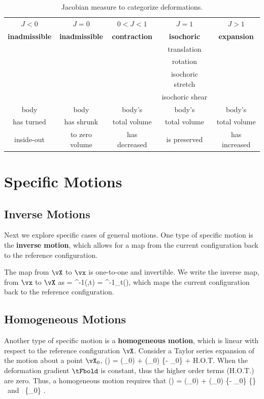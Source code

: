 \begin{table}[htb]
\caption{Jacobian measure to categorize deformations.}
\label{tab:jacobian_categories}
\begin{center}
\begin{tabular}{|c|c|c|c|c|} \hline
 $J<0$ & $J=0$ & $0<J<1$ & $J=1$ & $J>1$ \\ %
 {\bf inadmissible}
 & {\bf inadmissible}
 & {\bf contraction} 
 & {\bf isochoric} 
 & {\bf expansion} 
 \\ \hline \hline
  &  &  & translation &  \\ 
  &  &  & rotation &  \\ 
  &  &  & isochoric stretch & \\ 
  &  &  & isochoric shear   & \\ \hline
 body 
 & body 
 & body's  
 & body's 
 & body's
 \\
 has turned 
 & has shrunk 
 & total volume 
 & total volume
 & total volume \\ 
 inside-out 
 & to zero volume 
 & has decreased 
 & is preserved 
 & has increased \\ \hline
\end{tabular}
\end{center}
\end{table}




\section{Specific Motions}

\subsection{Inverse Motions}
Next we explore specific cases of general motions.  
One type of specific motion is the {\bf inverse motion}, which allows
for a map from the current configuration back to the reference
configuration.

The map from $\vX$ to $\vx$ is one-to-one and invertible.  
We write the inverse map, from $\vx$ to $\vX$ as
\be
\vX = \vvarphi^{-1}(\vx,t) = \vvarphi^{-1}_t(\vx),
\label{eq:motion_inverse}
\ee
which maps the current configuration back to the reference 
configuration.


\subsection{Homogeneous Motions}
Another type of specific motion is a {\bf homogeneous motion}, which 
is linear with respect to the reference configuration $\vX$.  
Consider a Taylor series expansion of the motion about a point 
$\vX_0$,
\be
 \vvarphi(\vX) = \vvarphi(\vX_0) + \tFbold(\vX_0) \cdot 
 \{\vX - \vX_0\} + 
 \mbox{\small H.O.T.}
 \label{eq:Taylor_F}
\ee
When the deformation gradient $\tFbold$ is constant, thus the 
higher order terms ({\small H.O.T.}) are zero.  Thus, a homogeneous
motion requires that
\be
 \vvarphi(\vX) = \vvarphi(\vX_0) + \tFbold(\vX_0)
 \cdot \{\vX - \vX_0\} 
 \;\; \forall \;\; \{\vX\} \mbox{ and } \{\vX_0\} \in \cB.
 \label{eq:homogeneous_motion}
\ee

